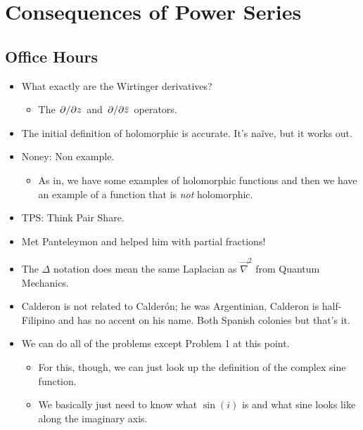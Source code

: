\documentclass[../notes.tex]{subfiles}
\begin{document}
\chapter{Consequences of Power Series}
\section{Office Hours}
\begin{itemize}
    \item {}What exactly are the Wirtinger derivatives?
    \begin{itemize}
        \item The $\pdv*{z}$ and $\pdv*{\bar{z}}$ operators.
    \end{itemize}
    \item The initial definition of holomorphic is accurate. It's na\"{i}ve, but it works out.
    \item Noney: Non example.
    \begin{itemize}
        \item As in, we have some examples of holomorphic functions and then we have an example of a function that is \emph{not} holomorphic.
    \end{itemize}
    \item TPS: Think Pair Share.
    \item Met Panteleymon and helped him with partial fractions!
    \item The $\Delta$ notation does mean the same Laplacian as $\vec{\nabla}^2$ from Quantum Mechanics.
    \item Calderon is not related to Calder\'{o}n; he was Argentinian, Calderon is half-Filipino and has no accent on his name. Both Spanish colonies but that's it.
    \item We can do all of the problems except Problem 1 at this point.
    \begin{itemize}
        \item For this, though, we can just look up the definition of the complex sine function.
        \item We basically just need to know what $\sin(i)$ is and what sine looks like along the imaginary axis.
    \end{itemize}
\end{itemize}
\end{document}
